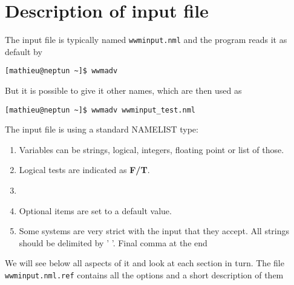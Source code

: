 \documentclass[12pt]{amsart}
\begin{document}
\section{Description of input file}
The input file is typically named {\tt wwminput.nml} and the program reads it as default by 
\begin{verbatim}
[mathieu@neptun ~]$ wwmadv
\end{verbatim}
But it is possible to give it other names, which are then used as
\begin{verbatim}
[mathieu@neptun ~]$ wwmadv wwminput_test.nml
\end{verbatim}
The input file is using a standard NAMELIST type:
\begin{enumerate}
\item Variables can be strings, logical, integers, floating point or list of those.
\item Logical tests are indicated as {\bf F/T}.
\item 
\item Optional items are set to a default value.
\item Some systems are very strict with the input that they accept. All strings should be delimited by '   '. Final comma at the end 
\end{enumerate}
We will see below all aspects of it and look at each section in turn.
The file {\tt wwminput.nml.ref} contains all the options and a short description of them
\end{document}
